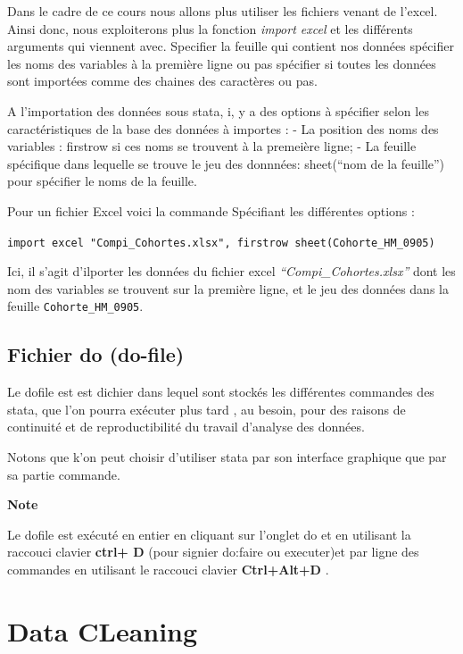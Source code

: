\documentclass[
]{book}
\begin{document}
Dans le cadre de ce cours nous allons plus utiliser les fichiers venant de l'excel. Ainsi donc, nous exploiterons plus la fonction \emph{import excel} et les différents arguments qui viennent avec.
Specifier la feuille qui contient nos données
spécifier les noms des variables à la première ligne ou pas
spécifier si toutes les données sont importées comme des chaines des caractères ou pas.

A l'importation des données sous stata, i, y a des options à spécifier selon les caractéristiques de la base des données à importes :
- La position des noms des variables : firstrow si ces noms se trouvent à la premeière ligne;
- La feuille spécifique dans lequelle se trouve le jeu des donnnées: sheet(``nom de la feuille'') pour spécifier le noms de la feuille.

Pour un fichier Excel voici la commande Spécifiant les différentes options :

\texttt{import\ excel\ "Compi\_Cohortes.xlsx",\ firstrow\ sheet(Cohorte\_HM\_0905)}

Ici, il s'agit d'ilporter les données du fichier excel \emph{``Compi\_Cohortes.xlsx''} dont les nom des variables se trouvent sur la première ligne, et le jeu des données dans la feuille \texttt{Cohorte\_HM\_0905}.

\hypertarget{fichier-do-do-file}{%
\section{Fichier do (do-file)}\label{fichier-do-do-file}}

Le dofile est est dichier dans lequel sont stockés les différentes commandes des stata, que l'on pourra exécuter plus tard , au besoin, pour des raisons de continuité et de reproductibilité du travail d'analyse des données.

Notons que k'on peut choisir d'utiliser stata par son interface graphique que par sa partie commande.

\textbf{Note}

Le dofile est exécuté en entier en cliquant sur l'onglet do et en utilisant la raccouci clavier \textbf{ctrl+ D }(pour signier do:faire ou executer)et par ligne des commandes en utilisant le raccouci clavier \textbf{Ctrl+Alt+D} .

\hypertarget{data-cleaning}{%
\chapter{Data CLeaning}\label{data-cleaning}}
\end{document}
